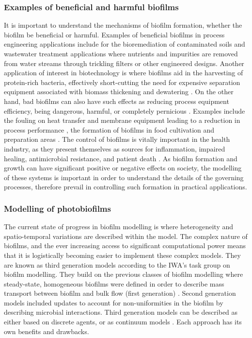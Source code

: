 \subsubsection{Examples of beneficial and harmful biofilms}
It is important to understand the mechanisms of biofilm formation, whether the biofilm be beneficial or harmful. Examples of beneficial biofilms in process engineering applications include for the bioremediation of contaminated soils \cite{singh2006} and wastewater treatment applications where nutrients and impurities are removed from water streams through trickling filters or other engineered designs. Another application of interest in biotechnology is where biofilms aid in the harvesting of protein-rich bacteria, effectively short-cutting the need for expensive separation equipment associated with biomass thickening and dewatering \cite{Hulsen2016a}.
\skippingparagraph
On the other hand, bad biofilms can also have such effects as reducing process equipment efficiency, being dangerous, harmful, or completely pernicious \cite{donlan2002}. Examples include the fouling on heat transfer and membrane equipment leading to a reduction in process performance \cite{mcdonogh1994199}, the formation of biofilms in food cultivation and preparation areas \cite{wirtanen2003}. The control of biofilms is vitally important in the health industry, as they present themselves as sources for inflammation, impaired healing, antimicrobial resistance, and patient death \cite{bryers2008}. As biofilm formation and growth can have significant positive or negative effects on society, the modelling of these systems is important in order to understand the details of the governing processes, therefore prevail in controlling such formation in practical applications. 


\subsubsection{Modelling of photobiofilms}
The current state of progress in biofilm modelling is where heterogeneity and spatio-temporal variations are described within the model. The complex nature of biofilms, and the ever increasing access to significant computational power means that it is logistically becoming easier to implement these complex models. They are known as third generation models according to the IWA's task group on biofilm modelling. They build on the previous classes of biofilm modelling where steady-state, homogeneous biofilms were defined in order to describe mass transport between biofilm and bulk flow (first generation) \cite{iwabiofilms}. Second generation models included updates to account for non-uniformities in the biofilm by describing microbial interactions. Third generation models can be described as either based on discrete agents, or as continuum models \cite{Mattei2015}. Each approach has its own benefits and drawbacks.

